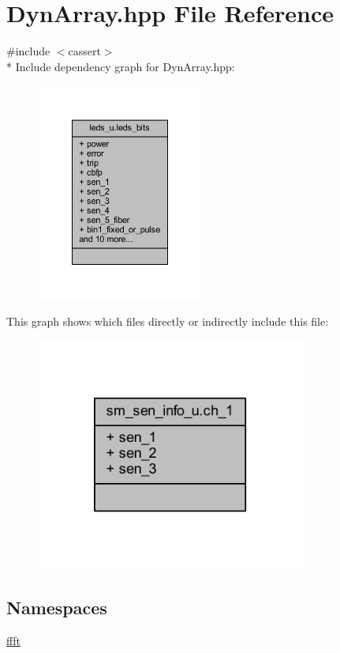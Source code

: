\hypertarget{a00092}{\section{Dyn\+Array.\+hpp File Reference}
\label{a00092}
}
{\ttfamily \#include $<$cassert$>$}\\*
Include dependency graph for Dyn\+Array.\+hpp\+:
\nopagebreak
\begin{figure}[H]
\begin{center}
\leavevmode
\includegraphics[width=156pt]{d3/d1a/a00251}
\end{center}
\end{figure}
This graph shows which files directly or indirectly include this file\+:
\nopagebreak
\begin{figure}[H]
\begin{center}
\leavevmode
\includegraphics[width=252pt]{dc/ded/a00252}
\end{center}
\end{figure}
\subsection*{Namespaces}
\begin{DoxyCompactItemize}
\item 
 \hyperlink{a00142}{ffft}
\end{DoxyCompactItemize}
